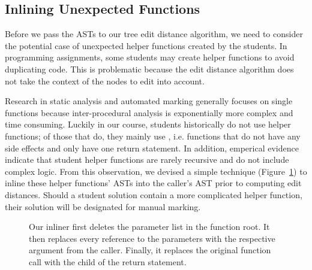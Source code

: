 \subsection{Inlining Unexpected Functions}

Before we pass the ASTs to our tree edit distance algorithm, we need to consider the potential case of unexpected helper functions created by the students. In programming assignments, some students may create helper functions to avoid duplicating code. This is problematic because the edit distance algorithm does not take the context of the nodes to edit into account.

Research in static analysis and automated marking generally focuses on single functions because inter-procedural analysis is exponentially more complex and time consuming. Luckily in our course, students historically do not use helper functions; of those that do, they mainly use , i.e. functions that do not have any side effects and only have one return statement. In addition, emperical evidence indicate that student helper functions are rarely recursive and do not include complex logic. From this observation, we devised a simple technique (Figure~\ref{fig:cam-inlining}) to inline these helper functions' ASTs into the caller's AST prior to computing edit distances. Should a student solution contain a more complicated helper function, their solution will be designated for manual marking.

\begin{figure}
\begin{minipage}{.45\textwidth}

\end{minipage}
\hfill
\begin{minipage}{.45\textwidth}

\end{minipage}
\caption[Inlining Unexpected Student Functions]{Our inliner first deletes the parameter list in the function root. It then replaces every reference to the parameters with the respective argument from the caller. Finally, it replaces the original function call with the child of the return statement.}
\label{fig:cam-inlining}
\end{figure}

